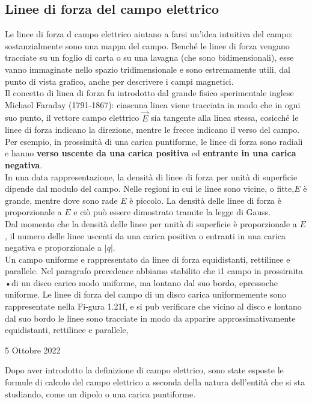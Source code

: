 \documentclass[a4paper]{extarticle}
\begin{document}
\subsection{Linee di forza del campo elettrico}
Le linee di forza d campo elettrico aiutano a farsi un'idea intuitiva del campo: sostanzialmente sono una mappa del campo. Benché le linee di forza vengano tracciate su un foglio di carta o su una lavagna (che sono bidimensionali), esse vanno immaginate nello spazio tridimensionale e sono estremamente utili, dal punto di vista grafico, anche per descrivere i campi magnetici.\\
Il concetto di linea di forza fu introdotto dal grande fisico sperimentale inglese Michael Faraday (1791-1867): ciascuna linea viene tracciata in modo che in ogni suo punto, il vettore campo elettrico $\vec E$ sia tangente alla linea stessa, cosicché le linee di forza indicano la direzione, mentre le frecce indicano il verso del campo.\\
Per esempio, in prossimità di una carica puntiforme, le linee di forza sono radiali e hanno \textbf{verso uscente da una carica positiva} ed \textbf{entrante in una carica negativa}.\\
In una data rappresentazione, la densità di linee di forza per unità di superficie dipende dal modulo del campo. Nelle regioni in cui le linee sono vicine, o fitte,$E$ è grande, mentre dove sono rade $E$ è piccolo. La densità delle linee di forza è proporzionale a $E$ e ciò può essere dimostrato tramite la legge di Gauss.\\
Dal momento che la densità delle linee per unità di superficie è proporzionale a $E$, il numero delle linee uscenti da una carica positiva o entranti in una carica negativa e proporzionale a $\vert q \vert$.\\
Un campo uniforme e rappresentato da linee di forza equidistanti, rettilinee e parallele. Nel paragrafo precedence abbiamo stabilito che i1 campo in prossirnita •di un disco carico modo uniforme, ma lontano dal suo bordo, epressoche uniforme. Le linee di forza del campo di un disco carica uniformemente sono rappresentate nella Fi-gura 1.21f, e si pub verificare che vicino al disco e lontano dal suo bordo le linee sono tracciate in modo da apparire approssimativamente equidistanti, rettilinee e parallele,

\newpage
\noindent
\begin{center}
  5 Ottobre 2022
\end{center}
Dopo aver introdotto la definizione di campo elettrico, sono state esposte le formule di calcolo del campo elettrico a seconda della natura dell'entità che si sta studiando, come un dipolo o una carica puntiforme.
\end{document}
